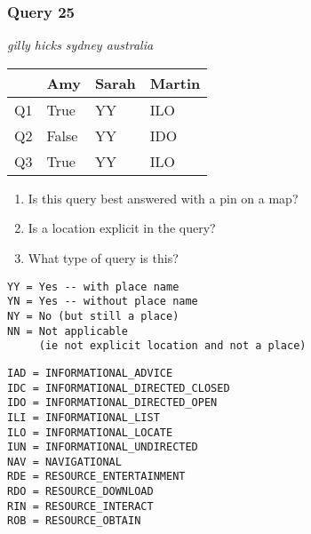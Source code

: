\begin{frame}[fragile]
\frametitle{Query 25}
\vspace{1em}

\emph{gilly hicks sydney australia}

\vfill

\begin{table}
  \centering
  \begin{tabular}{ l l l l }
    & \textbf{Amy} & \textbf{Sarah} & \textbf{Martin}\\
    \toprule
    Q1 & True & YY & ILO\\
Q2 & False & YY & IDO\\
Q3 & True & YY & ILO\\
    \bottomrule
  \end{tabular}
\end{table}

\vfill

\tiny{

\begin{enumerate}
\item Is this query best answered with a pin on a map?
\item Is a location explicit in the query?
\item What type of query is this?
\end{enumerate}

\vfill

\begin{multicols}{2}
\begin{verbatim}
YY = Yes -- with place name
YN = Yes -- without place name
NY = No (but still a place)
NN = Not applicable 
     (ie not explicit location and not a place)
\end{verbatim}

\columnbreak
\begin{verbatim}
IAD = INFORMATIONAL_ADVICE
IDC = INFORMATIONAL_DIRECTED_CLOSED
IDO = INFORMATIONAL_DIRECTED_OPEN
ILI = INFORMATIONAL_LIST
ILO = INFORMATIONAL_LOCATE
IUN = INFORMATIONAL_UNDIRECTED
NAV = NAVIGATIONAL
RDE = RESOURCE_ENTERTAINMENT
RDO = RESOURCE_DOWNLOAD
RIN = RESOURCE_INTERACT
ROB = RESOURCE_OBTAIN
\end{verbatim}
\end{multicols}
}

\end{frame}


